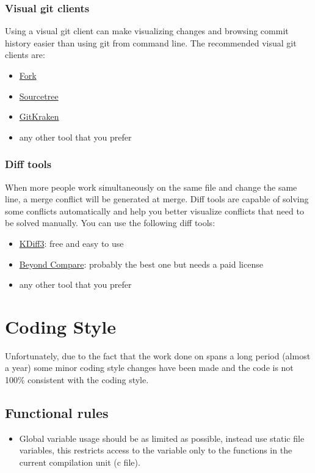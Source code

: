 \begin{appendices}
\FloatBarrier
\subsection{Visual git clients}
Using a visual git client can make visualizing changes and browsing commit history easier than using git from command line.
The recommended visual git clients are:
\begin{itemize}
	\item \href{https://git-fork.com}{Fork}
	\item \href{https://www.sourcetreeapp.com}{Sourcetree}
	\item \href{https://www.gitkraken.com}{GitKraken}
	\item any other tool that you prefer
\end{itemize}

\subsection{Diff tools}
When more people work simultaneously on the same file and change the same line, a merge conflict will be generated at merge.
Diff tools are capable of solving some conflicts automatically and help you better visualize conflicts that need to be solved manually.
You can use the following diff tools:
\begin{itemize}
	\item \href{http://kdiff3.sourceforge.net}{KDiff3}: free and easy to use
	\item \href{https://www.scootersoftware.com}{Beyond Compare}: probably the best one but needs a paid license
	\item any other tool that you prefer
\end{itemize}

\chapter{Coding Style}

Unfortunately, due to the fact that the work done on \projectname spans a long period (almost a
year) some minor coding style changes have been made and the code is not 100\% consistent with the
coding style.

\section{Functional rules}
\begin{itemize}
	\item Global variable usage should be as limited as possible, instead use static file variables,
this restricts access to the variable only to the functions in the current compilation unit (c file).


\end{itemize}
\end{appendices}
